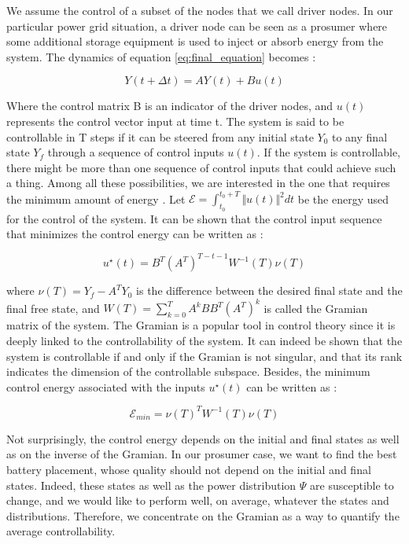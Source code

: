\documentclass[conference]{IEEEtran}
\begin{document}
We assume the control of a subset of the nodes that we call driver nodes. In our particular power grid situation, a driver node can be seen as a prosumer where some additional storage equipment is used to inject or absorb energy from the system. The dynamics of equation \ref{eq:final_equation} becomes :


\begin{equation}
 Y(t+\Delta t) = A Y(t) + B u(t) 
\end{equation}


Where the control matrix B is an indicator of the driver nodes, and $ u(t) $ represents the control vector input at time t. The system is said to be controllable in T steps if it can be steered from any initial state $ Y_0 $ to any final state $ Y_f $ through a sequence of control inputs $ u(t) $. If the system is controllable, there might be more than one sequence of control inputs that could achieve such a thing. Among all these possibilities, we are interested in the one that requires the minimum amount of energy \cite{Yan2012}. Let $ \mathcal{E} = \int_{t_0}^{t_0+T} \Vert u(t) \Vert^2 dt $ be the energy used for the control of the system. It can be shown \cite{Liu2015} that the control input sequence that minimizes the control energy can be written as :


\begin{equation}
 u^{\star}(t) = B^T(A^T)^{T-t-1}W^{-1}(T)\nu(T)
\end{equation}


where $ \nu(T) = Y_f - A^T Y_0 $ is the difference between the desired final state and the final free state, and $W(T) = \sum_{k=0}^{T} A^k B B^T (A^T)^k $ is called the Gramian matrix of the system. The Gramian is a popular tool in control theory since it is deeply linked to the controllability of the system. It can indeed be shown that the system is controllable if and only if the Gramian is not singular, and that its rank indicates the dimension of the controllable subspace. Besides, the minimum control energy associated with the inputs $ u^{\star}(t)$ can be written as :


\begin{equation}
 \mathcal{E}_{min} = \nu(T)^T W^{-1}(T) \nu(T)
\end{equation}


Not surprisingly, the control energy depends on the initial and final states as well as on the inverse of the Gramian. In our prosumer case, we want to find the best battery placement, whose quality should not depend on the initial and final states. Indeed, these states as well as  the power  distribution $ \Psi $ are susceptible to change, and we would like to perform well, on average, whatever the states and distributions. Therefore, we concentrate on  the Gramian as a way to quantify the average controllability. 
\end{document}
